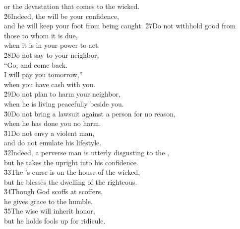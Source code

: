 \begin{poetry}
\poemll    or the devastation that comes to the wicked. \\
\poeml \v{26}Indeed, the  will be your confidence, \\
\poemll    and he will keep your foot from being caught.
\poeml \v{27}Do not withhold good from those to whom it is due, \\
\poemll    when it is in your power to act. \\
\poeml \v{28}Do not say to your neighbor, \\
\poemll    ``Go, and come back. \\
\poemlll       I will pay you tomorrow,'' \\
\poeml when you have cash with you. \\
\poeml \v{29}Do not plan to harm your neighbor, \\
\poemll    when he is living peacefully beside you. \\
\poeml \v{30}Do not bring a lawsuit against a person for no reason, \\
\poemll    when he has done you no harm. \\
\poeml \v{31}Do not envy a violent man, \\
\poemll    and do not emulate his lifestyle. \\
\poeml \v{32}Indeed, a perverse man is utterly disgusting to the , \\
\poemll    but he takes the upright into his confidence. \\
\poeml \v{33}The 's curse is on the house of the wicked, \\
\poemll    but he blesses the dwelling of the righteous. \\
\poeml \v{34}Though God scoffs at scoffers, \\
\poemll    he gives grace to the humble. \\
\poeml \v{35}The wise will inherit honor, \\
\poemll    but he holds fools up for ridicule.
\end{poetry}

